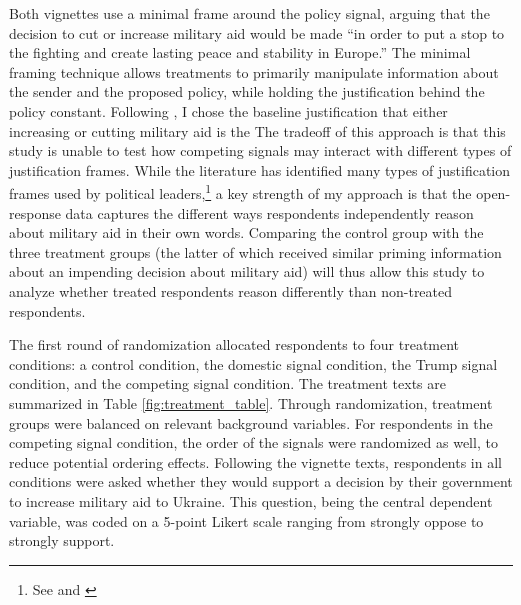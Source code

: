 Both vignettes use a minimal frame around the policy signal, arguing that the decision to cut or increase military aid would be made \enquote{in order to put a stop to the fighting and create lasting peace and stability in Europe.} The minimal framing technique allows treatments to primarily manipulate information about the sender and the proposed policy, while holding the justification behind the policy constant. Following \textcite{levendusky_when_2012}, I chose the baseline justification that either increasing or cutting military aid is the  The tradeoff of this approach is that this study is unable to test how competing signals may interact with different types of justification frames. While the literature has identified many types of justification frames used by political leaders,\footnote{See \textcite{reiter_manipulating_2024} and \textcite{xu_reneging_2023}} a key strength of my approach is that the open-response data captures the different ways respondents independently reason about military aid in their own words. Comparing the control group with the three treatment groups (the latter of which received similar priming information about an impending decision about military aid) will thus allow this study to analyze whether treated respondents reason differently than non-treated respondents. 

The first round of randomization allocated respondents to four treatment conditions: a control condition, the domestic signal condition, the Trump signal condition, and the competing signal condition. The treatment texts are summarized in Table \ref{fig:treatment_table}. Through randomization, treatment groups were balanced on relevant background variables. For respondents in the competing signal condition, the order of the signals were randomized as well, to reduce potential ordering effects. Following the vignette texts, respondents in all conditions were asked whether they would support a decision by their government to increase military aid to Ukraine. This question, being the central dependent variable, was coded on a 5-point Likert scale ranging from strongly oppose to strongly support. 

